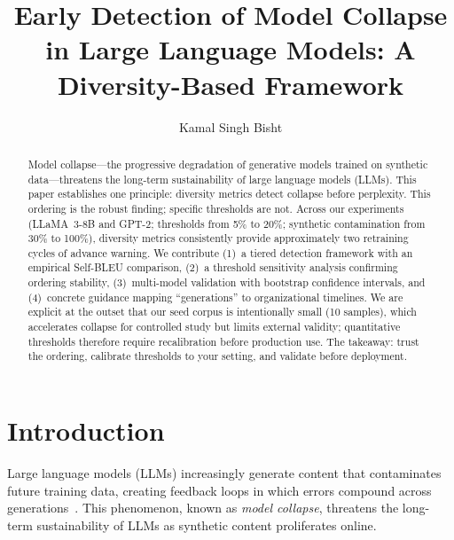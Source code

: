 \documentclass{svproc}
\begin{document}
\mainmatter
%
\title{Early Detection of Model Collapse in Large Language Models: A Diversity-Based Framework}
%
%
\author{Kamal Singh Bisht}
%
%
%

\maketitle

\begin{abstract}
Model collapse---the progressive degradation of generative models trained on
synthetic data---threatens the long-term sustainability of large language models
(LLMs). This paper establishes one principle: diversity metrics detect collapse
before perplexity. This ordering is the robust finding; specific thresholds are
not. Across our experiments (LLaMA~3-8B and GPT-2; thresholds from 5\% to 20\%;
synthetic contamination from 30\% to 100\%), diversity metrics consistently
provide approximately two retraining cycles of advance warning. We contribute
(1)~a tiered detection framework with an empirical Self-BLEU comparison, (2)~a
threshold sensitivity analysis confirming ordering stability, (3)~multi-model
validation with bootstrap confidence intervals, and (4)~concrete guidance mapping
``generations'' to organizational timelines. We are explicit at the outset that
our seed corpus is intentionally small (10 samples), which accelerates collapse
for controlled study but limits external validity; quantitative thresholds
therefore require recalibration before production use. The takeaway: trust the
ordering, calibrate thresholds to your setting, and validate before deployment.
\end{abstract}

\section{Introduction}\label{sec:intro}
Large language models (LLMs) increasingly generate content that contaminates
future training data, creating feedback loops in which errors compound across
generations~\cite{shumailov2024nature,shumailov2023curse}. This phenomenon, known
as \emph{model collapse}, threatens the long-term sustainability of LLMs as
synthetic content proliferates online.
\end{document}
